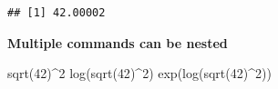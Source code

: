 \documentclass[
]{book}
\newenvironment{Shaded}{\begin{snugshade}}{\end{snugshade}}
\newcommand{\DecValTok}[1]{\textcolor[rgb]{0.00,0.00,0.81}{#1}}
\newcommand{\FunctionTok}[1]{\textcolor[rgb]{0.00,0.00,0.00}{#1}}
\newcommand{\NormalTok}[1]{#1}
\newcommand{\SpecialCharTok}[1]{\textcolor[rgb]{0.00,0.00,0.00}{#1}}
\begin{document}
\begin{verbatim}
## [1] 42.00002
\end{verbatim}

\textbf{Multiple commands can be nested}

\begin{Shaded}
\begin{Highlighting}[]
\FunctionTok{sqrt}\NormalTok{(}\DecValTok{42}\NormalTok{)}\SpecialCharTok{\^{}}\DecValTok{2}
\FunctionTok{log}\NormalTok{(}\FunctionTok{sqrt}\NormalTok{(}\DecValTok{42}\NormalTok{)}\SpecialCharTok{\^{}}\DecValTok{2}\NormalTok{)}
\FunctionTok{exp}\NormalTok{(}\FunctionTok{log}\NormalTok{(}\FunctionTok{sqrt}\NormalTok{(}\DecValTok{42}\NormalTok{)}\SpecialCharTok{\^{}}\DecValTok{2}\NormalTok{))}
\end{Highlighting}
\end{Shaded}


  
\end{document}
